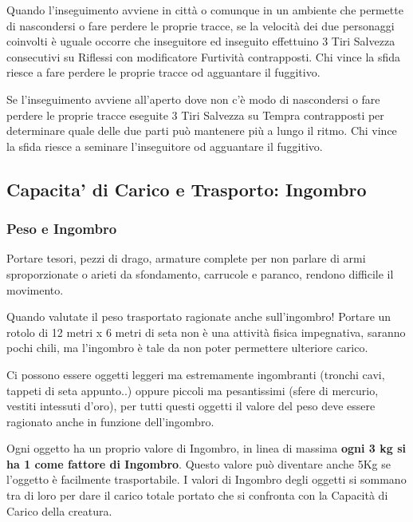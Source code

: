 \begin{multicols}{2}
Quando l'inseguimento avviene in città o comunque in un ambiente che permette di nascondersi o fare perdere le proprie tracce, se la velocità dei due personaggi coinvolti è uguale occorre che inseguitore ed inseguito effettuino 3 Tiri Salvezza consecutivi su Riflessi con modificatore Furtività contrapposti. Chi vince la sfida riesce a fare perdere le proprie tracce od agguantare il fuggitivo.

Se l'inseguimento avviene all'aperto dove non c'è modo di nascondersi o fare perdere le proprie tracce eseguite 3 Tiri Salvezza su Tempra contrapposti per determinare quale delle due parti può mantenere più a lungo il ritmo. Chi vince la sfida riesce a seminare l'inseguitore od agguantare il fuggitivo.

\subsection{Capacita' di Carico e Trasporto: Ingombro}\hypertarget{ingombro}{}\label{ingombro}

\label{sec:capacita-di-carico-e-trasporto-ingombro}

\subsubsection{Peso e Ingombro}

Portare tesori, pezzi di drago, armature complete per non parlare di armi sproporzionate o arieti da sfondamento, carrucole e paranco, rendono difficile il movimento.

Quando valutate il peso trasportato ragionate anche sull'ingombro!
Portare un rotolo di 12 metri x 6 metri di seta non è una attività fisica impegnativa, saranno pochi chili, ma l'ingombro è tale da non poter permettere ulteriore carico.

Ci possono essere oggetti leggeri ma estremamente ingombranti (tronchi cavi, tappeti di seta appunto..) oppure piccoli ma pesantissimi (sfere di mercurio, vestiti intessuti d'oro), per tutti questi oggetti il valore del peso deve essere ragionato anche in funzione dell'ingombro.

Ogni oggetto ha un proprio valore di Ingombro, in linea di massima \textbf{ogni 3 kg si ha 1 come fattore di Ingombro}. Questo valore può diventare anche 5Kg se l'oggetto è facilmente trasportabile. I valori di Ingombro degli oggetti si sommano tra di loro per dare il carico totale portato che si confronta con la Capacità di Carico della creatura.


\end{multicols}
